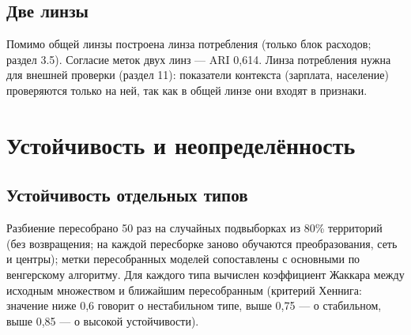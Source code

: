 \documentclass[11pt,a4paper]{article}
\begin{document}
\endgroup

\subsection{Две линзы}\label{ux434ux432ux435-ux43bux438ux43dux437ux44b-1}

Помимо общей линзы построена линза потребления (только блок расходов; раздел 3.5). Согласие меток двух линз --- ARI 0,614. Линза потребления нужна для внешней проверки (раздел 11): показатели контекста (зарплата, население) проверяются только на ней, так как в общей линзе они входят в признаки.

\section{Устойчивость и неопределённость}\label{ux443ux441ux442ux43eux439ux447ux438ux432ux43eux441ux442ux44c-ux438-ux43dux435ux43eux43fux440ux435ux434ux435ux43bux451ux43dux43dux43eux441ux442ux44c}

\subsection{Устойчивость отдельных типов}\label{ux443ux441ux442ux43eux439ux447ux438ux432ux43eux441ux442ux44c-ux43eux442ux434ux435ux43bux44cux43dux44bux445-ux442ux438ux43fux43eux432}

Разбиение пересобрано 50 раз на случайных подвыборках из 80\% территорий (без возвращения; на каждой пересборке заново обучаются преобразования, сеть и центры); метки пересобранных моделей сопоставлены с основными по венгерскому алгоритму. Для каждого типа вычислен коэффициент Жаккара между исходным множеством и ближайшим пересобранным (критерий Хеннига: значение ниже 0,6 говорит о нестабильном типе, выше 0,75 --- о стабильном, выше 0,85 --- о высокой устойчивости).

\begingroup\footnotesize\setlength{\tabcolsep}{4pt}
\end{document}
